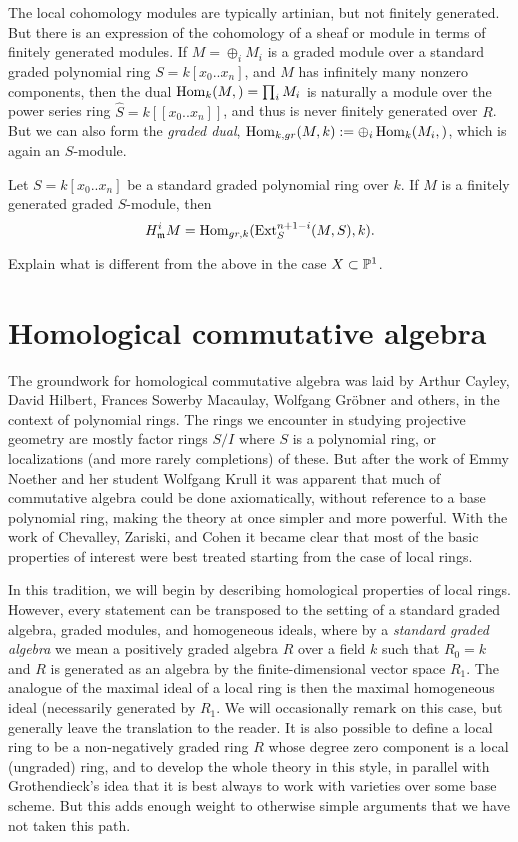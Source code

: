 The local cohomology modules  are typically artinian, but not finitely generated. But there is an 
expression of the cohomology of a sheaf or module in terms of finitely generated modules. If
$M = \oplus_{i} M_{i}$ is a graded module over a standard graded polynomial ring $S = k[x_{0}..x_{n}]$, and $M$ has infinitely many nonzero components, then the dual 
$\Hom_{k}(M,) = \prod_{i} M_{i}$ is naturally a module over the power series ring 
$\hat S = k[[x_{0}..x_{n}]]$, and thus is never finitely generated over $R$. But we can also form the
\emph{graded dual}, $\Hom_{k,gr}(M,k) := \oplus_{i}\Hom_{k}(M_{i},)$, which is again an $S$-module.

\begin{theorem}\label{local duality}
Let $S = k[x_{0}..x_{n}]$ be a standard graded polynomial ring over $k$. If $M$ is a finitely generated graded $S$-module, then
$$
H^{i}_{\gm} M = \Hom_{gr,k}(\Ext_{S}^{n+1-i}(M,S), k).
$$
\end{theorem}
\begin{exercise}
 Explain what is different from the above in the case $X\subset \PP^{1}$.
\end{exercise}

\section{Homological commutative algebra} 

The groundwork for homological commutative algebra was laid by Arthur Cayley, David Hilbert, Frances Sowerby Macaulay, Wolfgang Gr\"obner and others, in the context of polynomial rings. The rings we encounter in studying projective geometry are mostly factor rings $S/I$ where $S$ is a polynomial ring, or localizations (and more rarely completions) of these. But after the work of Emmy Noether and her student Wolfgang Krull it was apparent that much of commutative algebra could be done axiomatically, without reference to a base polynomial ring, making the theory at once simpler and more powerful. With the work of Chevalley, Zariski, and Cohen it became clear that most of the basic properties of interest were best treated starting from the case of local rings.

In this tradition, we will begin by describing homological properties of local rings. 
However, every statement can be transposed to the setting of a standard graded algebra, graded modules, and homogeneous ideals, where by a \emph{standard graded algebra} we mean a positively graded algebra $R$ over a field $k$ such that $R_{0} = k$ and $R$ is generated as an algebra by the finite-dimensional vector space $R_{1}$. The analogue of the maximal ideal of a local ring is then the maximal homogeneous ideal (necessarily generated by $R_{1}$. We will occasionally remark on this case, but generally leave the translation to the reader. It is also possible to define a local ring to be a non-negatively graded ring $R$ whose degree zero component is a local (ungraded) ring, and to develop the whole theory in this style, in parallel with Grothendieck's idea that it is best always to work with varieties over some base scheme. But this adds enough weight to otherwise simple arguments that we have not taken this path. 

